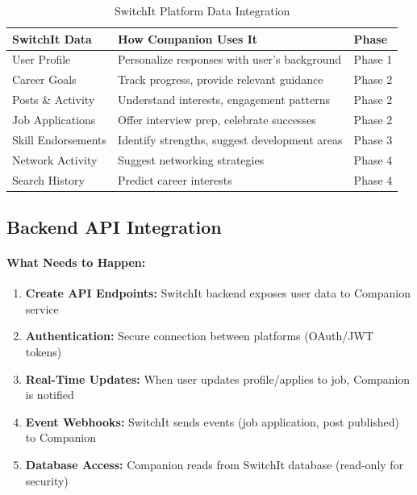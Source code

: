 \documentclass[12pt,a4paper]{article}
\begin{document}
\begin{table}[h]
\centering
\begin{tabularx}{\textwidth}{|l|X|l|}
\hline
\textbf{SwitchIt Data} & \textbf{How Companion Uses It} & \textbf{Phase} \\
\hline
User Profile & Personalize responses with user's background & Phase 1 \\
\hline
Career Goals & Track progress, provide relevant guidance & Phase 2 \\
\hline
Posts \& Activity & Understand interests, engagement patterns & Phase 2 \\
\hline
Job Applications & Offer interview prep, celebrate successes & Phase 2 \\
\hline
Skill Endorsements & Identify strengths, suggest development areas & Phase 3 \\
\hline
Network Activity & Suggest networking strategies & Phase 4 \\
\hline
Search History & Predict career interests & Phase 4 \\
\hline
\end{tabularx}
\caption{SwitchIt Platform Data Integration}
\end{table}

\subsection{Backend API Integration}

\paragraph{What Needs to Happen:}

\begin{enumerate}[leftmargin=*]
    \item \textbf{Create API Endpoints:} SwitchIt backend exposes user data to Companion service
    \item \textbf{Authentication:} Secure connection between platforms (OAuth/JWT tokens)
    \item \textbf{Real-Time Updates:} When user updates profile/applies to job, Companion is notified
    \item \textbf{Event Webhooks:} SwitchIt sends events (job application, post published) to Companion
    \item \textbf{Database Access:} Companion reads from SwitchIt database (read-only for security)
\end{enumerate}
\end{document}
